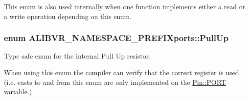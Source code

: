 This enum is also used internally when one function implements either a read or a write operation depending on this enum. 
\subsubsection[{\texorpdfstring{Pull\+Up}{PullUp}}]{\setlength{\rightskip}{0pt plus 5cm}enum {\bf A\+L\+I\+B\+V\+R\+\_\+\+N\+A\+M\+E\+S\+P\+A\+C\+E\+\_\+\+P\+R\+E\+F\+I\+Xports\+::\+Pull\+Up}\hspace{0.3cm}{\ttfamily [strong]}}\hypertarget{namespaceALIBVR__NAMESPACE__PREFIXports_ae4be55f1d106e37c89f38c66f674b53a}{}\label{namespaceALIBVR__NAMESPACE__PREFIXports_ae4be55f1d106e37c89f38c66f674b53a}


Type safe enum for the internal Pull Up resistor. 

When using this enum the compiler can verify that the correct register is used (i.\+e. casts to and from this enum are only implemented on the \hyperlink{structALIBVR__NAMESPACE__PREFIXports_1_1Pin_a0d296d2ad6858263ef7aff31969a0b2d}{Pin\+::\+P\+O\+RT} variable.) 
